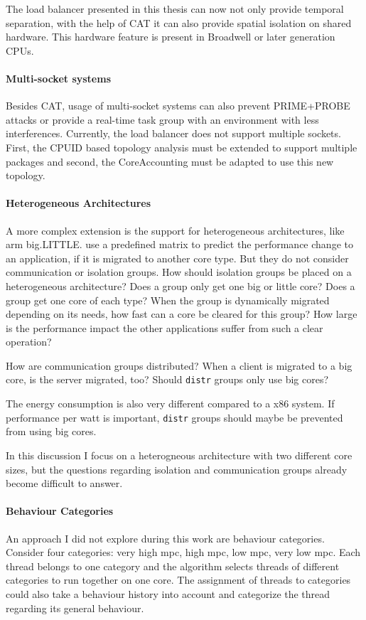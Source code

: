 The load balancer presented in  this thesis can now not only provide temporal
separation, with the help of CAT it can also provide spatial isolation on
shared hardware.
This hardware feature is present in Broadwell or later generation CPUs.

\paragraph{Multi-socket systems}
Besides CAT, usage of multi-socket systems can also prevent PRIME+PROBE attacks
or provide a real-time task group with an environment with less interferences.
Currently, the load balancer does not support multiple sockets.
First, the CPUID based topology analysis must be extended to support multiple
packages and second, the CoreAccounting must be adapted to use this new
topology.

\paragraph{Heterogeneous Architectures}
A more complex extension is the support for heterogeneous architectures, like
\gls{arm} big.LITTLE.
\citeauthor{sarma_smartbalance_2015} use a predefined matrix to predict the
performance change to an application, if it is migrated to another core type.
But they do not consider communication or isolation groups.
How should isolation groups be placed on a heterogeneous architecture?
Does a group only get one big or little core?
Does a group get one core of each type?
When the group is dynamically migrated depending on its needs, how fast can a
core be cleared for this group?
How large is the performance impact the other applications suffer from such a
clear operation?

How are communication groups distributed?
When a client is migrated to a big core, is the server migrated, too?
Should \texttt{distr} groups only use big cores?

The energy consumption is also very different compared to a x86 system.
If performance per watt is important, \texttt{distr} groups should maybe be
prevented from using big cores.

In this discussion I focus on a heterogneous architecture with two different
core sizes, but the questions regarding isolation and communication groups
already become difficult to answer.



\paragraph{Behaviour Categories}
An approach I did not explore during this work are behaviour categories.
Consider four categories: very high \gls{mpc}, high \gls{mpc}, low \gls{mpc},
very low \gls{mpc}.
Each thread belongs to one category and the algorithm selects threads of
different categories to run together on one core.
The assignment of threads to categories could also take a behaviour history
into account and categorize the thread regarding its general behaviour.


